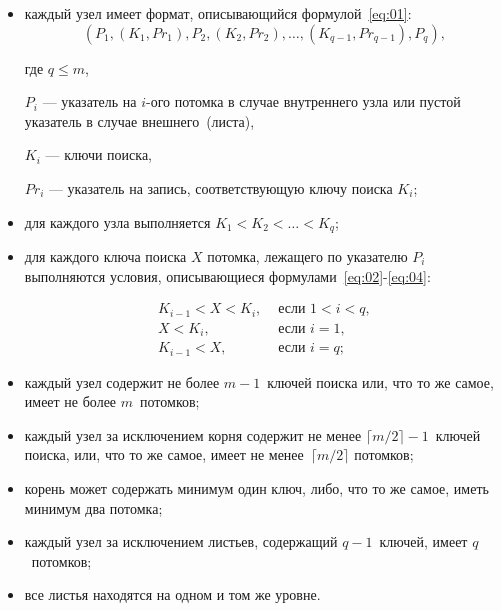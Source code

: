 \begin{itemize}
    \item каждый узел имеет формат, описывающийся формулой~\eqref{eq:01}:
        \begin{equation}\label{eq:01}
            (P_1, (K_1, Pr_1), P_2, (K_2, Pr_2), \dots, (K_{q-1}, Pr_{q-1}),
            P_q),
        \end{equation}

        где $q \leqslant m$,

        $P_i$ --- указатель на $i$-ого потомка в случае внутреннего узла или
        пустой указатель в случае внешнего~(листа),

        $K_i$ --- ключи поиска,

        $Pr_i$ --- указатель на запись, соответствующую ключу поиска $K_i$;

    \item для каждого узла выполняется $K_1 < K_2 < \dots < K_q$;

    \item для каждого ключа поиска $X$ потомка, лежащего по указателю $P_i$
        выполняются условия, описывающиеся
        формулами~\eqref{eq:02}-\eqref{eq:04}:
        
        \vspace{-1cm}
        \begin{align}
            K_{i-1} < X < K_i, & \text{ если } 1 < i < q, \label{eq:02}\\
            X < K_i, & \text{ если } i = 1, \label{eq:03}\\
            K_{i-1} < X, & \text{ если } i = q \label{eq:04};
        \end{align}
        \vspace{-1cm}

    \item каждый узел содержит не более $m - 1$~ключей поиска или, что то же
        самое, имеет не более $m$~потомков;

    \item каждый узел за исключением корня содержит не менее $\lceil m / 2
        \rceil - 1$~ключей поиска, или, что то же самое, имеет не менее~$\lceil
        m / 2 \rceil$ потомков;

    \item корень может содержать минимум один ключ, либо, что то же самое, иметь
        минимум два потомка;

    \item каждый узел за исключением листьев, содержащий $q-1$~ключей, имеет
        $q$~потомков;

    \item все листья находятся на одном и том же уровне.
\end{itemize}

